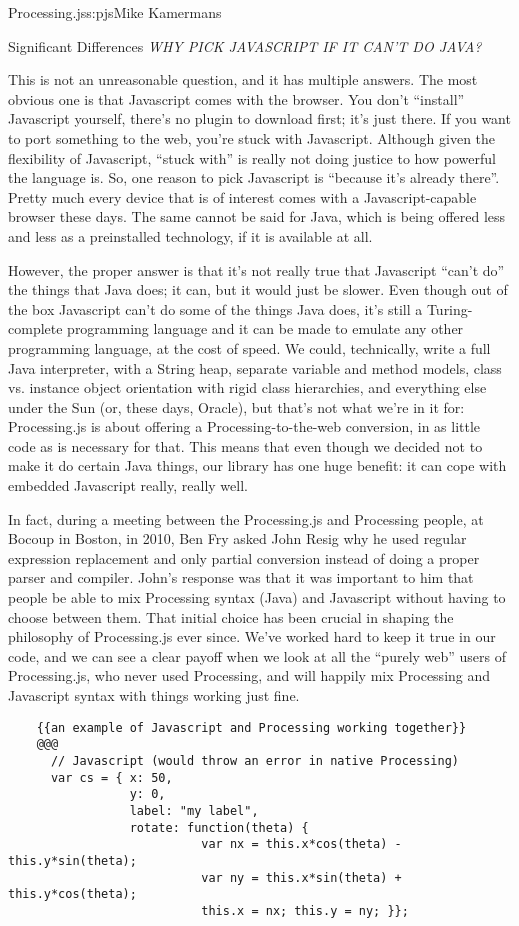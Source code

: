 \begin{aosachapter}{Processing.js}{s:pjs}{Mike Kamermans}
\begin{aosasect1}{Significant Differences}
\emph{WHY PICK JAVASCRIPT IF IT CAN'T DO JAVA?}

This is not an unreasonable question, and it has multiple answers. The
most obvious one is that Javascript comes with the browser. You don't
``install'' Javascript yourself, there's no plugin to download first;
it's just there. If you want to port something to the web, you're
stuck with Javascript. Although given the flexibility of Javascript,
``stuck with'' is really not doing justice to how powerful the language
is. So, one reason to pick Javascript is ``because it's already
there''. Pretty much every device that is of interest comes with a
Javascript-capable browser these days. The same cannot be said for
Java, which is being offered less and less as a preinstalled
technology, if it is available at all.

However, the proper answer is that it's not really true that
Javascript ``can't do'' the things that Java does; it can, but it would
just be slower. Even though out of the box Javascript can't do some of
the things Java does, it's still a Turing-complete programming
language and it can be made to emulate any other programming language,
at the cost of speed. We could, technically, write a full Java
interpreter, with a String heap, separate variable and method models,
class vs. instance object orientation with rigid class hierarchies,
and everything else under the Sun (or, these days, Oracle), but that's
not what we're in it for: Processing.js is about offering a
Processing-to-the-web conversion, in as little code as is necessary
for that. This means that even though we decided not to make it do
certain Java things, our library has one huge benefit: it can cope
with embedded Javascript really, really well.

In fact, during a meeting between the Processing.js and Processing
people, at Bocoup in Boston, in 2010, Ben Fry asked John Resig why he
used regular expression replacement and only partial conversion
instead of doing a proper parser and compiler. John's response was
that it was important to him that people be able to mix Processing
syntax (Java) and Javascript without having to choose between
them. That initial choice has been crucial in shaping the philosophy
of Processing.js ever since. We've worked hard to keep it true in our
code, and we can see a clear payoff when we look at all the ``purely
web'' users of Processing.js, who never used Processing, and will
happily mix Processing and Javascript syntax with things working just
fine.

\begin{verbatim}
    {{an example of Javascript and Processing working together}}
    @@@
      // Javascript (would throw an error in native Processing)
      var cs = { x: 50,
                 y: 0,
                 label: "my label",
                 rotate: function(theta) {
                           var nx = this.x*cos(theta) - this.y*sin(theta);
                           var ny = this.x*sin(theta) + this.y*cos(theta);
                           this.x = nx; this.y = ny; }};


\end{verbatim}
\end{aosasect1}
\end{aosachapter}
